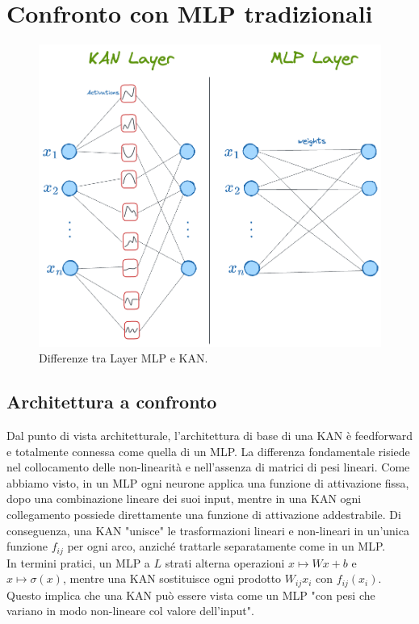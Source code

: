 \documentclass[a4paper,12pt]{report}
\begin{document}
	\section{Confronto con MLP tradizionali}
	
	\begin{figure}[H]
		\centering
		\includegraphics[width=1.0\textwidth]{img/KANvsMLP_layer.png}
		\caption{Differenze tra Layer MLP e KAN.}
	\end{figure}
	
	\subsection{Architettura a confronto}
	Dal punto di vista architetturale, l’architettura di base di una KAN è feedforward e totalmente connessa come quella di un MLP. La differenza fondamentale risiede nel collocamento delle non-linearità e nell’assenza di matrici di pesi lineari. Come abbiamo visto, in un MLP ogni neurone applica una funzione di attivazione fissa, dopo una combinazione lineare dei suoi input, mentre in una KAN ogni collegamento possiede direttamente una funzione di attivazione addestrabile. Di conseguenza, una KAN "unisce" le trasformazioni lineari e non-lineari in un’unica funzione $f_{ij}$ per ogni arco, anziché trattarle separatamente come in un MLP. \\
	In termini pratici, un MLP a $L$ strati alterna operazioni $x \mapsto W x + b$ e $x \mapsto \sigma(x)$, mentre una KAN sostituisce ogni prodotto $W_{ij}x_i$ con $f_{ij}(x_i)$. Questo implica che una KAN può essere vista come un MLP "con pesi che variano in modo non-lineare col valore dell'input". \\
	
\end{document}
